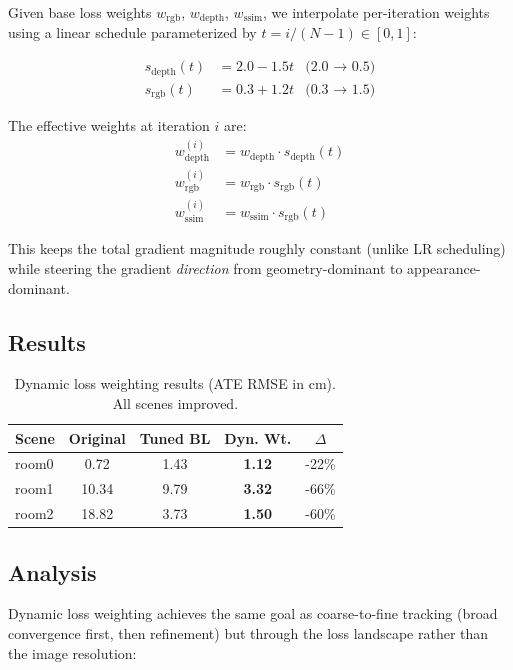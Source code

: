 \documentclass[10pt,twocolumn]{article}
\begin{document}
Given base loss weights $w_\text{rgb}$, $w_\text{depth}$, $w_\text{ssim}$, we interpolate per-iteration weights using a linear schedule parameterized by $t = i / (N-1) \in [0, 1]$:

\begin{align}
    s_\text{depth}(t) &= 2.0 - 1.5t & \text{(2.0 $\to$ 0.5)} \\
    s_\text{rgb}(t) &= 0.3 + 1.2t & \text{(0.3 $\to$ 1.5)}
\end{align}

The effective weights at iteration $i$ are:
\begin{align}
    w_\text{depth}^{(i)} &= w_\text{depth} \cdot s_\text{depth}(t) \\
    w_\text{rgb}^{(i)} &= w_\text{rgb} \cdot s_\text{rgb}(t) \\
    w_\text{ssim}^{(i)} &= w_\text{ssim} \cdot s_\text{rgb}(t)
\end{align}

This keeps the total gradient magnitude roughly constant (unlike LR scheduling) while steering the gradient \emph{direction} from geometry-dominant to appearance-dominant.

\subsection{Results}

\begin{table}[h]
\centering
\caption{Dynamic loss weighting results (ATE RMSE in cm). All scenes improved.}
\label{tab:dynamic}
\begin{tabular}{lcccc}
\toprule
\textbf{Scene} & \textbf{Original} & \textbf{Tuned BL} & \textbf{Dyn. Wt.} & \textbf{$\Delta$} \\
\midrule
room0 & 0.72 & 1.43 & \textcolor{improved}{\textbf{1.12}} & -22\% \\
room1 & 10.34 & 9.79 & \textcolor{improved}{\textbf{3.32}} & -66\% \\
room2 & 18.82 & 3.73 & \textcolor{improved}{\textbf{1.50}} & -60\% \\
\bottomrule
\end{tabular}
\end{table}

\subsection{Analysis}

Dynamic loss weighting achieves the same goal as coarse-to-fine tracking (broad convergence first, then refinement) but through the loss landscape rather than the image resolution:
\end{document}
